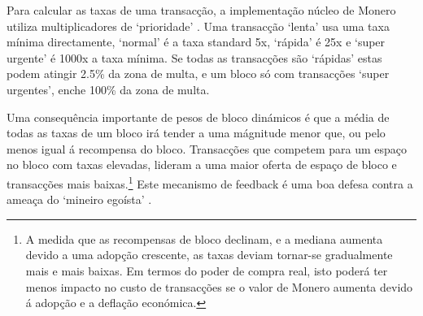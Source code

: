 

Para calcular as taxas de uma transacção, a implementação núcleo de Monero utiliza multiplicadores de `prioridade' . Uma transacção `lenta' usa uma taxa mínima directamente, `normal' é a taxa standard 5x, `rápida' é 25x e `super urgente' é 1000x a taxa mínima. Se todas as transacções são `rápidas' estas podem atingir 2.5\% da zona de multa, e um bloco só com transacções `super urgentes', enche 100\% da zona de multa.   

Uma consequência importante de pesos de bloco dinámicos é que a média de todas as taxas de um bloco irá tender a uma mágnitude menor que, ou pelo menos igual á recompensa do bloco. Transacções que competem para um espaço no bloco com taxas elevadas, lideram a uma maior oferta de espaço de bloco e transacções mais baixas.\footnote{A medida que as recompensas de bloco declinam, e a mediana aumenta devido a uma adopção crescente, as taxas deviam tornar-se gradualmente mais e mais baixas. Em termos do poder de compra real, isto poderá ter menos impacto no custo de transacções se o valor de Monero aumenta devido á adopção e a deflação económica.}  
Este mecanismo de feedback é uma boa defesa contra a ameaça do `mineiro egoísta' \cite{selfish-miner}.


